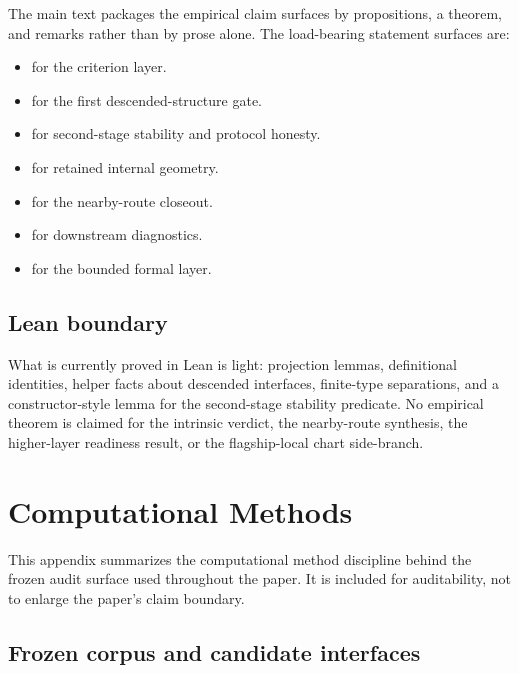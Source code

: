 \documentclass[11pt]{article}
\theoremstyle{definition}
\begin{document}
The main text packages the empirical claim surfaces by propositions, a theorem, and remarks rather than by prose alone. The load-bearing statement surfaces are:
\begin{itemize}
\item {} for the criterion layer.
\item {} for the first descended-structure gate.
\item {} for second-stage stability and protocol honesty.
\item {} for retained internal geometry.
\item {} for the nearby-route closeout.
\item {} for downstream diagnostics.
\item {} for the bounded formal layer.
\end{itemize}

\subsection*{Lean boundary}

What is currently proved in Lean is light: projection lemmas, definitional identities, helper facts about descended interfaces, finite-type separations, and a constructor-style lemma for the second-stage stability predicate. No empirical theorem is claimed for the intrinsic verdict, the nearby-route synthesis, the higher-layer readiness result, or the flagship-local chart side-branch.
 \section{Computational Methods}
\label{app:computational-methods}

This appendix summarizes the computational method discipline behind the frozen audit surface used throughout the paper. It is included for auditability, not to enlarge the paper's claim boundary.

\subsection*{Frozen corpus and candidate interfaces}
\end{document}
